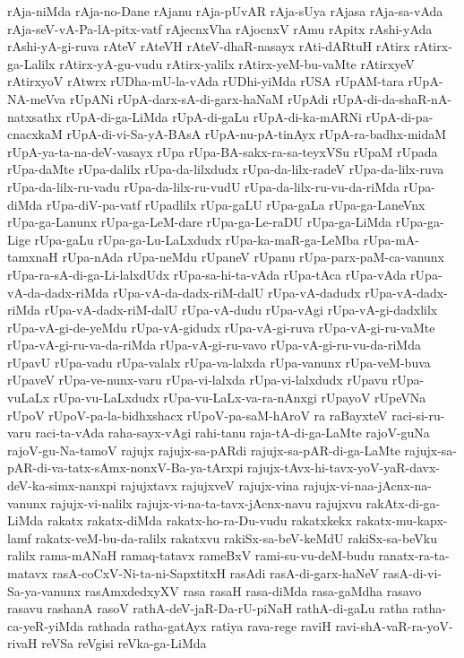 {rAja-niMda
rAja-no-Dane
rAjanu
rAja-pUvAR
rAja-sUya
rAjasa
rAja-sa-vAda
rAja-seV-vA-Pa-lA-pitx-vatf
rAjecnxVha
rAjocnxV
rAmu
rApitx
rAshi-yAda
rAshi-yA-gi-ruva
rAteV
rAteVH
rAteV-dhaR-nasayx
rAti-dARtuH
rAtirx
rAtirx-ga-Lalilx
rAtirx-yA-gu-vudu
rAtirx-yalilx
rAtirx-yeM-bu-vaMte
rAtirxyeV
rAtirxyoV
rAtwrx
rUDha-mU-la-vAda
rUDhi-yiMda
rUSA
rUpAM-tara
rUpA-NA-meVva
rUpANi
rUpA-darx-sA-di-garx-haNaM
rUpAdi
rUpA-di-da-shaR-nA-natxsathx
rUpA-di-ga-LiMda
rUpA-di-gaLu
rUpA-di-ka-mARNi
rUpA-di-pa-cnacxkaM
rUpA-di-vi-Sa-yA-BAsA
rUpA-nu-pA-tinAyx
rUpA-ra-badhx-midaM
rUpA-ya-ta-na-deV-vasayx
rUpa
rUpa-BA-sakx-ra-sa-teyxVSu
rUpaM
rUpada
rUpa-daMte
rUpa-dalilx
rUpa-da-lilxdudx
rUpa-da-lilx-radeV
rUpa-da-lilx-ruva
rUpa-da-lilx-ru-vadu
rUpa-da-lilx-ru-vudU
rUpa-da-lilx-ru-vu-da-riMda
rUpa-diMda
rUpa-diV-pa-vatf
rUpadlilx
rUpa-gaLU
rUpa-gaLa
rUpa-ga-LaneVnx
rUpa-ga-Lanunx
rUpa-ga-LeM-dare
rUpa-ga-Le-raDU
rUpa-ga-LiMda
rUpa-ga-Lige
rUpa-gaLu
rUpa-ga-Lu-LaLxdudx
rUpa-ka-maR-ga-LeMba
rUpa-mA-tamxnaH
rUpa-nAda
rUpa-neMdu
rUpaneV
rUpanu
rUpa-parx-paM-ca-vanunx
rUpa-ra-sA-di-ga-Li-lalxdUdx
rUpa-sa-hi-ta-vAda
rUpa-tAca
rUpa-vAda
rUpa-vA-da-dadx-riMda
rUpa-vA-da-dadx-riM-dalU
rUpa-vA-dadudx
rUpa-vA-dadx-riMda
rUpa-vA-dadx-riM-dalU
rUpa-vA-dudu
rUpa-vAgi
rUpa-vA-gi-dadxlilx
rUpa-vA-gi-de-yeMdu
rUpa-vA-gidudx
rUpa-vA-gi-ruva
rUpa-vA-gi-ru-vaMte
rUpa-vA-gi-ru-va-da-riMda
rUpa-vA-gi-ru-vavo
rUpa-vA-gi-ru-vu-da-riMda
rUpavU
rUpa-vadu
rUpa-valalx
rUpa-va-lalxda
rUpa-vanunx
rUpa-veM-buva
rUpaveV
rUpa-ve-nunx-varu
rUpa-vi-lalxda
rUpa-vi-lalxdudx
rUpavu
rUpa-vuLaLx
rUpa-vu-LaLxdudx
rUpa-vu-LaLx-va-ra-nAnxgi
rUpayoV
rUpeVNa
rUpoV
rUpoV-pa-la-bidhxshacx
rUpoV-pa-saM-hAroV
ra
raBayxteV
raci-si-ru-varu
raci-ta-vAda
raha-sayx-vAgi
rahi-tanu
raja-tA-di-ga-LaMte
rajoV-guNa
rajoV-gu-Na-tamoV
rajujx
rajujx-sa-pARdi
rajujx-sa-pAR-di-ga-LaMte
rajujx-sa-pAR-di-va-tatx-sAmx-nonxV-Ba-ya-tArxpi
rajujx-tAvx-hi-tavx-yoV-yaR-davx-deV-ka-simx-nanxpi
rajujxtavx
rajujxveV
rajujx-vina
rajujx-vi-naa-jAcnx-na-vanunx
rajujx-vi-nalilx
rajujx-vi-na-ta-tavx-jAcnx-navu
rajujxvu
rakAtx-di-ga-LiMda
rakatx
rakatx-diMda
rakatx-ho-ra-Du-vudu
rakatxkekx
rakatx-mu-kapx-lamf
rakatx-veM-bu-da-ralilx
rakatxvu
rakiSx-sa-beV-keMdU
rakiSx-sa-beVku
ralilx
rama-mANaH
ramaq-tatavx
rameBxV
rami-su-vu-deM-budu
ranatx-ra-ta-matavx
rasA-coCxV-Ni-ta-ni-SapxtitxH
rasAdi
rasA-di-garx-haNeV
rasA-di-vi-Sa-ya-vanunx
rasAmxdedxyXV
rasa
rasaH
rasa-diMda
rasa-gaMdha
rasavo
rasavu
rashanA
rasoV
rathA-deV-jaR-Da-rU-piNaH
rathA-di-gaLu
ratha
ratha-ca-yeR-yiMda
rathada
ratha-gatAyx
ratiya
rava-rege
raviH
ravi-shA-vaR-ra-yoV-rivaH
reVSa
reVgisi
reVka-ga-LiMda
}
